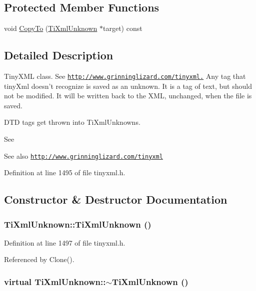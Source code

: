 \subsection*{Protected Member Functions}
\begin{DoxyCompactItemize}
\item 
void \hyperlink{class_ti_xml_unknown_a08ca7b225a2bcb604d3c72e199d33408}{CopyTo} (\hyperlink{class_ti_xml_unknown}{TiXmlUnknown} $\ast$target) const 
\end{DoxyCompactItemize}


\subsection{Detailed Description}
TinyXML class. See \href{http://www.grinninglizard.com/tinyxml.}{\tt http://www.grinninglizard.com/tinyxml.} Any tag that tinyXml doesn't recognize is saved as an unknown. It is a tag of text, but should not be modified. It will be written back to the XML, unchanged, when the file is saved.

DTD tags get thrown into TiXmlUnknowns.

See \begin{DoxySeeAlso}{See also}
\href{http://www.grinninglizard.com/tinyxml}{\tt http://www.grinninglizard.com/tinyxml} 
\end{DoxySeeAlso}


Definition at line 1495 of file tinyxml.h.

\subsection{Constructor \& Destructor Documentation}
\hypertarget{class_ti_xml_unknown_a945f09b3c6538099c69fc563216750c3}{
\subsubsection[{TiXmlUnknown}]{\setlength{\rightskip}{0pt plus 5cm}TiXmlUnknown::TiXmlUnknown ()}}
\label{class_ti_xml_unknown_a945f09b3c6538099c69fc563216750c3}


Definition at line 1497 of file tinyxml.h.

Referenced by Clone().\hypertarget{class_ti_xml_unknown_ac21966c3b551553d760b4a339c9acda0}{
\subsubsection[{$\sim$TiXmlUnknown}]{\setlength{\rightskip}{0pt plus 5cm}virtual TiXmlUnknown::$\sim$TiXmlUnknown ()}}
\label{class_ti_xml_unknown_ac21966c3b551553d760b4a339c9acda0}


